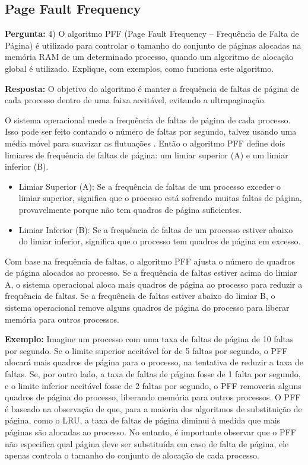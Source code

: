 \documentclass{article}
\begin{document}
\subsection{Page Fault Frequency}

\textbf{Pergunta:} 4) O algoritmo PFF (Page Fault Frequency – Frequência de Falta de Página) é utilizado para controlar o tamanho do conjunto de páginas alocadas na memória RAM de um determinado processo, quando um algoritmo de alocação global é utilizado. Explique, com exemplos, como funciona este algoritmo.  \newline

\textbf{Resposta:} O objetivo do algoritmo é manter a frequência de faltas de página de cada processo dentro de uma faixa aceitável, evitando a ultrapaginação.

O sistema operacional mede a frequência de faltas de página de cada processo. Isso pode ser feito contando o número de faltas por segundo, talvez usando uma média móvel para suavizar as flutuações \textcite[p. 155]{tanenbaum2021}. Então o algoritmo PFF define dois limiares de frequência de faltas de página: um limiar superior (A) e um limiar inferior (B). 
  
\begin{itemize}
  \item Limiar Superior (A): Se a frequência de faltas de um processo exceder o limiar superior, significa que o processo está sofrendo muitas faltas de página, provavelmente porque não tem quadros de página suficientes.
  \item Limiar Inferior (B): Se a frequência de faltas de um processo estiver abaixo do limiar inferior, significa que o processo tem quadros de página em excesso.
\end{itemize}

Com base na frequência de faltas, o algoritmo PFF ajusta o número de quadros de página alocados ao processo. Se a frequência de faltas estiver acima do limiar A, o sistema operacional aloca mais quadros de página ao processo para reduzir a frequência de faltas. Se a frequência de faltas estiver abaixo do limiar B, o sistema operacional remove alguns quadros de página do processo para liberar memória para outros processos.

\textbf{Exemplo:} Imagine um processo com uma taxa de faltas de página de 10 faltas por segundo. Se o limite superior aceitável for de 5 faltas por segundo, o PFF alocará mais quadros de página para o processo, na tentativa de reduzir a taxa de faltas. Se, por outro lado, a taxa de faltas de página fosse de 1 falta por segundo, e o limite inferior aceitável fosse de 2 faltas por segundo, o PFF removeria alguns quadros de página do processo, liberando memória para outros processos.
O PFF é baseado na observação de que, para a maioria dos algoritmos de substituição de página, como o LRU, a taxa de faltas de página diminui à medida que mais páginas são alocadas ao processo. No entanto, é importante observar que o PFF não especifica qual página deve ser substituída em caso de falta de página, ele apenas controla o tamanho do conjunto de alocação de cada processo.
\end{document}
